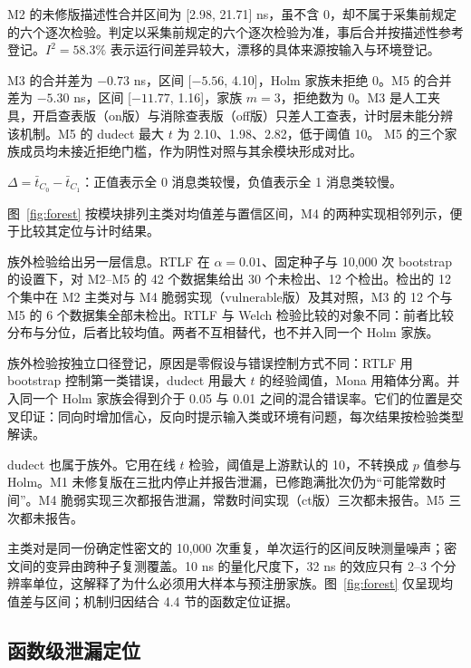 M2 的未修版描述性合并区间为 [2.98, 21.71] ns，虽不含 0，却不属于采集前规定的六个逐次检验。判定以采集前规定的六个逐次检验为准，事后合并按描述性参考登记。$I^2=58.3\%$ 表示运行间差异较大，漂移的具体来源按输入与环境登记。

M3 的合并差为 $-0.73$ ns，区间 [$-5.56$, 4.10]，Holm 家族未拒绝 0。M5 的合并差为 $-5.30$ ns，区间 [$-11.77$, 1.16]，家族 $m=3$，拒绝数为 0。M3 是人工夹具，开启查表版（on版）与消除查表版（off版）只差人工查表，计时层未能分辨该机制。M5 的 dudect 最大 $t$ 为 2.10、1.98、2.82，低于阈值 10。%
M5 的三个家族成员均未接近拒绝门槛，作为阴性对照与其余模块形成对比。

$\Delta=\bar t_{C_0}-\bar t_{C_1}$：正值表示全 0 消息类较慢，负值表示全 1 消息类较慢。


图~\ref{fig:forest} 按模块排列主类对均值差与置信区间，M4 的两种实现相邻列示，便于比较其定位与计时结果。

族外检验给出另一层信息。RTLF 在 $\alpha=0.01$、固定种子与 10,000 次 bootstrap 的设置下，对 M2--M5 的 42 个数据集给出 30 个未检出、12 个检出。检出的 12 个集中在 M2 主类对与 M4 脆弱实现（vulnerable版）及其对照，M3 的 12 个与 M5 的 6 个数据集全部未检出。RTLF 与 Welch 检验比较的对象不同：前者比较分布与分位，后者比较均值。两者不互相替代，也不并入同一个 Holm 家族。\cite{rtlf} %

族外检验按独立口径登记，原因是零假设与错误控制方式不同：RTLF 用 bootstrap 控制第一类错误，dudect 用最大 $t$ 的经验阈值，Mona 用箱体分离。并入同一个 Holm 家族会得到介于 0.05 与 0.01 之间的混合错误率。它们的位置是交叉印证：同向时增加信心，反向时提示输入类或环境有问题，每次结果按检验类型解读。

dudect 也属于族外。它用在线 $t$ 检验，阈值是上游默认的 10，不转换成 $p$ 值参与 Holm。M1 未修复版在三批内停止并报告泄漏，已修跑满批次仍为“可能常数时间”。M4 脆弱实现三次都报告泄漏，常数时间实现（ct版）三次都未报告。M5 三次都未报告。\cite{dudect}

主类对是同一份确定性密文的 10,000 次重复，单次运行的区间反映测量噪声；密文间的变异由跨种子复测覆盖。10 ns 的量化尺度下，32 ns 的效应只有 2--3 个分辨率单位，这解释了为什么必须用大样本与预注册家族。图~\ref{fig:forest} 仅呈现均值差与区间；机制归因结合 4.4 节的函数定位证据。



\subsection{函数级泄漏定位}

